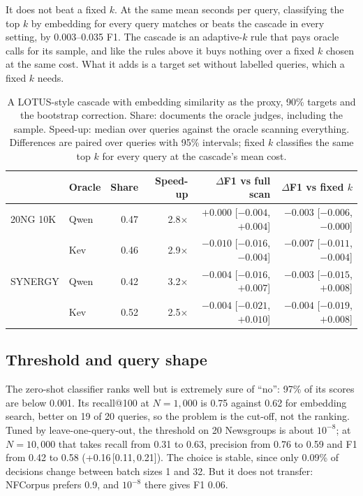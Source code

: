 \documentclass[11pt]{article}
\newcommand{\ci}[2]{\,[#1,\,#2]}
\begin{document}
It does not beat a fixed $k$. At the same mean seconds per query, classifying
the top $k$ by embedding for every query matches or beats the cascade in every
setting, by 0.003--0.035 F1. The cascade is an adaptive-$k$ rule that pays
oracle calls for its sample, and like the rules above it buys nothing over a
fixed $k$ chosen at the same cost. What it adds is a target set without
labelled queries, which a fixed $k$ needs.

\begin{table}[t]
\centering
\small
\begin{tabular}{@{}llrrrr@{}}
\toprule
 & Oracle & Share & Speed-up & $\Delta$F1 vs full scan & $\Delta$F1 vs fixed $k$ \\
\midrule
20NG 10K & Qwen & 0.47 & 2.8$\times$ & $+0.000$ [$-0.004$, $+0.004$] & $-0.003$ [$-0.006$, $-0.000$] \\
         & Kev  & 0.46 & 2.9$\times$ & $-0.010$ [$-0.016$, $-0.004$] & $-0.007$ [$-0.011$, $-0.004$] \\
SYNERGY  & Qwen & 0.42 & 3.2$\times$ & $-0.004$ [$-0.016$, $+0.007$] & $-0.003$ [$-0.015$, $+0.008$] \\
         & Kev  & 0.52 & 2.5$\times$ & $-0.004$ [$-0.021$, $+0.010$] & $-0.004$ [$-0.019$, $+0.008$] \\
\bottomrule
\end{tabular}
\caption{A LOTUS-style cascade with embedding similarity as the proxy, 90\%
targets and the bootstrap correction. Share: documents the oracle judges,
including the sample. Speed-up: median over queries against the oracle scanning
everything. Differences are paired over queries with 95\% intervals; fixed $k$
classifies the same top $k$ for every query at the cascade's mean cost.}
\label{tab:cascade}
\end{table}

\subsection{Threshold and query shape}
\label{sec:threshold}

The zero-shot classifier ranks well but is extremely sure of ``no'': 97\% of
its scores are below 0.001. Its recall@100 at $N=1{,}000$ is 0.75 against 0.62
for embedding search, better on 19 of 20 queries, so the problem is the cut-off,
not the ranking. Tuned by leave-one-query-out, the threshold on 20 Newsgroups is
about $10^{-8}$; at $N=10{,}000$ that takes recall from 0.31 to 0.63, precision
from 0.76 to 0.59 and F1 from 0.42 to 0.58 (+0.16\ci{0.11}{0.21}). The choice is
stable, since only 0.09\% of decisions change between batch sizes 1 and 32. But
it does not transfer: NFCorpus prefers 0.9, and $10^{-8}$ there gives F1 0.06.
\end{document}
